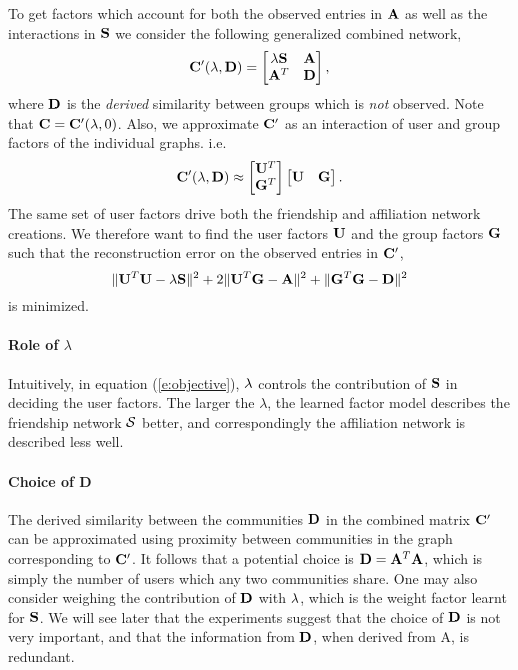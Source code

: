 To get factors which account for both the observed entries in $\mathbf{A}$ as well as the interactions in $\mathbf{S}$ we consider the following generalized combined network,
\begin{equation}
\mathbf{C}'(\lambda, \mathbf{D}) =
\begin{bmatrix}
\lambda \mathbf{S} & \mathbf{A} \\
\mathbf{A}^T & \mathbf{D}
\end{bmatrix},
\label{e:generalizedCombined}
\end{equation}
where $\mathbf{D}$ is the \emph{derived} similarity between groups which is \emph{not} observed. Note that $\mathbf{C} = \mathbf{C}'(\lambda, 0)$. Also, we approximate $\mathbf{C}'$ as an interaction of user and group factors of the individual graphs. i.e.
\[\mathbf{C}'(\lambda, \mathbf{D}) \approx
\begin{bmatrix}
\mathbf{U}^T \\
\mathbf{G}^T
\end{bmatrix}
\begin{bmatrix}
\mathbf{U} & \mathbf{G}
\end{bmatrix}.
\]
The same set of user factors drive both the friendship and affiliation network creations. We therefore want to find the user factors $\mathbf{U}$ and the group factors $\mathbf{G}$ such that the reconstruction error on the observed entries in $\mathbf{C}'$,
\begin{equation}
\|\mathbf{U}^T \mathbf{U} -\lambda \mathbf{S} \|^2 + 2\|\mathbf{U}^T \mathbf{G} -\mathbf{A} \|^2 + \|\mathbf{G}^T\mathbf{G} - \mathbf{D}\|^2
\label{e:objective}
\end{equation}
is minimized.

\paragraph*{Role of $\lambda$}
Intuitively, in equation (\ref{e:objective}), $\lambda$ controls the contribution of $\mathbf{S}$ in deciding the user factors. The larger the $\lambda$, the learned factor model describes the friendship network $\mathcal{S}$ better, and correspondingly the affiliation network is described less well.

\paragraph*{Choice of D}
The derived similarity between the communities $\mathbf{D}$ in the combined matrix $\mathbf{C}'$ can be approximated using proximity between communities in the graph corresponding to $\mathbf{C}'$. It follows that a potential choice is $\mathbf{D} = \mathbf{A}^T \mathbf{A}$, which is simply the number of users which any two communities share. One may also consider weighing the contribution of $\mathbf{D}$ with $\lambda$, which is the weight factor learnt for $\mathbf{S}$. We will see later that the experiments suggest that the choice of $\mathbf{D}$ is not very important, and that the information from $\mathbf{D}$, when derived from A, is redundant.


